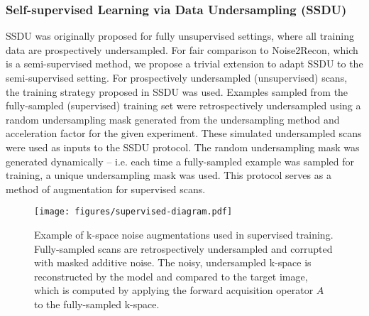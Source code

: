 \documentclass[10pt,twocolumn,letterpaper]{article}
\begin{document}
\subsubsection{Self-supervised Learning via Data Undersampling (SSDU)}
\label{app:ssdu}
SSDU was originally proposed for fully unsupervised settings, where all training data are prospectively undersampled. For fair comparison to Noise2Recon, which is a semi-supervised method, we propose a trivial extension to adapt SSDU to the semi-supervised setting. For prospectively undersampled (unsupervised) scans, the training strategy proposed in SSDU was used. Examples sampled from the fully-sampled (supervised) training set were retrospectively undersampled using a random undersampling mask generated from the undersampling method and acceleration factor for the given experiment. These simulated undersampled scans were used as inputs to the SSDU protocol. The random undersampling mask was generated dynamically -- i.e. each time a fully-sampled example was sampled for training, a unique undersampling mask was used. This protocol serves as a method of augmentation for supervised scans.

\begin{figure}[t!]
  \centering
  \begin{center}
      \texttt{[image: figures/supervised-diagram.pdf]}
  \end{center}
  \caption{Example of k-space noise augmentations used in supervised training. Fully-sampled scans are retrospectively undersampled and corrupted with masked additive noise. The noisy, undersampled k-space is reconstructed by the model and compared to the target image, which is computed by applying the forward acquisition operator $A$ to the fully-sampled k-space.}
  \label{fig:supervised-aug-schematic}
\end{figure}
\end{document}

